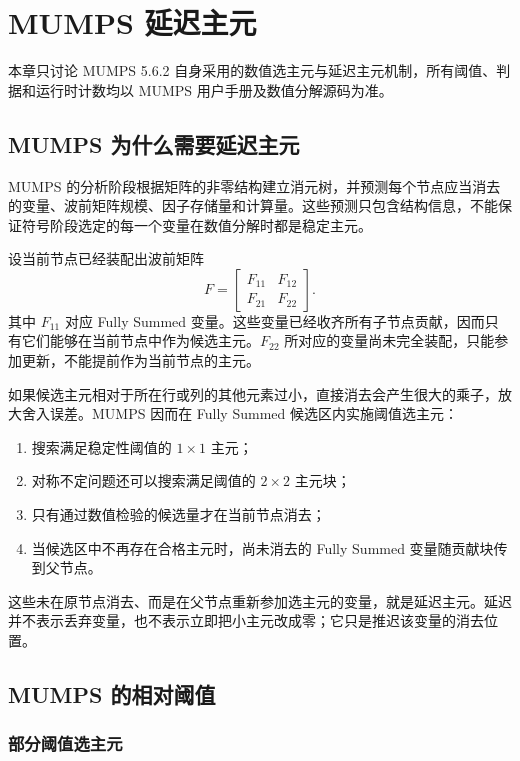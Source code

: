 \chapter{MUMPS 延迟主元}

本章只讨论 MUMPS 5.6.2 自身采用的数值选主元与延迟主元机制，所有阈值、判据和运行时计数均以 MUMPS 用户手册及数值分解源码为准。

\section{MUMPS 为什么需要延迟主元}

MUMPS 的分析阶段根据矩阵的非零结构建立消元树，并预测每个节点应当消去的变量、波前矩阵规模、因子存储量和计算量。这些预测只包含结构信息，不能保证符号阶段选定的每一个变量在数值分解时都是稳定主元。

设当前节点已经装配出波前矩阵
\[
F=
\begin{bmatrix}
F_{11} & F_{12}\\
F_{21} & F_{22}
\end{bmatrix}.
\]
其中 $F_{11}$ 对应 Fully Summed 变量。这些变量已经收齐所有子节点贡献，因而只有它们能够在当前节点中作为候选主元。$F_{22}$ 所对应的变量尚未完全装配，只能参加更新，不能提前作为当前节点的主元。

如果候选主元相对于所在行或列的其他元素过小，直接消去会产生很大的乘子，放大舍入误差。MUMPS 因而在 Fully Summed 候选区内实施阈值选主元：

\begin{enumerate}
  \item 搜索满足稳定性阈值的 $1\times1$ 主元；
  \item 对称不定问题还可以搜索满足阈值的 $2\times2$ 主元块；
  \item 只有通过数值检验的候选量才在当前节点消去；
  \item 当候选区中不再存在合格主元时，尚未消去的 Fully Summed 变量随贡献块传到父节点。
\end{enumerate}

这些未在原节点消去、而是在父节点重新参加选主元的变量，就是延迟主元。延迟并不表示丢弃变量，也不表示立即把小主元改成零；它只是推迟该变量的消去位置。

\section{MUMPS 的相对阈值 }

\subsection{部分阈值选主元}

